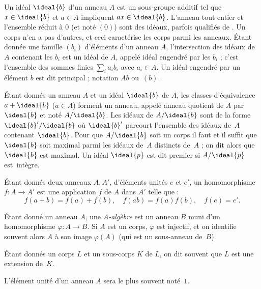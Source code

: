 \documentclass[11pt, %
  title in boldface,
  theorem in new line,
  theorem numbering = section,
  number theorems separately,
  simple name,
]{beaulivre}
\begin{document}
    Un idéal \( \ideal{b} \) d'un anneau \( A \) est un sous-groupe additif tel que \( x \in \ideal{b} \) et \( a \in A \) impliquent \( ax \in \ideal{b} \). L'anneau tout entier et l'ensemble réduit à \( 0 \) (et noté \( (0) \)) sont des idéaux, parfois qualifiés de . Un corps n'en a pas d'autres, et ceci caractérise les corps parmi les anneaux. Étant donnée une famille \( (b_i) \) d'éléments d'un anneau \( A \), l'intersection des idéaux de \( A \) contenant les \( b_i \) est un idéal de \( A \), appelé idéal engendré par les \( b_i \) ; c'est l'ensemble des sommes finies \( \sum_i a_i b_i \) avec \( a_i \in A \). Un idéal engendré par un élément \( b \) est dit principal ; notation \( Ab \) ou~\( (b) \).

    Étant donnés un anneau \( A \) et un idéal \( \ideal{b} \) de \( A \), les classes d'équivalence \( a+\ideal{b} \) (\( a \in A \)) forment un anneau, appelé anneau quotient de \( A \) par \( \ideal{b} \) et noté \( A/\ideal{b} \). Les idéaux de \( A/\ideal{b} \) sont de la forme \( \ideal{b}'/\ideal{b} \) où \( \ideal{b}' \) parcourt l'ensemble des idéaux de~\( A \) contenant \( \ideal{b} \). Pour que \( A/\ideal{b} \) soit un corps il faut et il suffit que \( \ideal{b} \) soit maximal parmi les idéaux de~\( A \) distincts de~\( A \) ; on dit alors que \( \ideal{b} \) est maximal. Un idéal \( \ideal{p} \) est dit premier si \( A/\ideal{p} \) est~intègre.

    Étant donnés deux anneaux \( A, A' \), d'éléments unités \( e \) et \( e' \), un homomorphisme \( f \colon A \to A' \) est une application \( f \) de \( A \) dans \( A' \) telle que :
    \[
        f(a+b) = f(a)+f(b), \quad f(ab) = f(a)f(b), \quad f(e) = e'.
    \]

    Étant donné un anneau \( A \), une \emph{\( A \)‑algèbre} est un anneau \( B \) muni d'un homomorphisme \( \varphi \colon A \to B \). Si \( A \) est un corps, \( \varphi \) est injectif, et on identifie souvent alors \( A \) à son image \( \varphi(A) \) (qui est un sous-anneau de~\( B \)).

    Étant donnés un corps \( L \) et un sous-corps \( K \) de \( L \), on dit souvent que \( L \) est une extension de~\( K \).

    L'élément unité d'un anneau \( A \) sera le plus souvent noté~\( 1 \).
\end{document}
